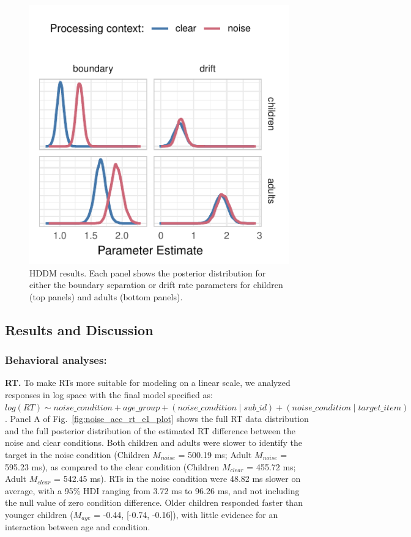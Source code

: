 \documentclass[10pt, letterpaper]{article}
\newenvironment{CodeChunk}{}{}
\begin{document}
\begin{CodeChunk}
\begin{figure}[t]

{\centering \includegraphics[width=0.75\linewidth]{figs/hddm_plot_noise-1} 

}

\caption[HDDM results]{HDDM results. Each panel shows the posterior distribution for either the boundary separation or drift rate parameters for children (top panels) and adults (bottom panels).}\label{fig:hddm_plot_noise}
\end{figure}
\end{CodeChunk}

\hypertarget{results-and-discussion}{%
\subsection{Results and Discussion}\label{results-and-discussion}}

\hypertarget{behavioral-analyses}{%
\subsubsection{Behavioral analyses:}\label{behavioral-analyses}}

\textbf{RT.} To make RTs more suitable for modeling on a linear scale,
we analyzed responses in log space with the final model specified as:
\texttt{$log(RT) \sim noise\_condition + age\_group + (noise\_condition \mid sub\_id ) + (noise\_condition \mid target\_item)$}.
Panel A of Fig.~\ref{fig:noise_acc_rt_e1_plot} shows the full RT data
distribution and the full posterior distribution of the estimated RT
difference between the noise and clear conditions. Both children and
adults were slower to identify the target in the noise condition
(Children \(M_{noise}\) = 500.19 ms; Adult \(M_{noise}\) = 595.23 ms),
as compared to the clear condition (Children \(M_{clear}\) = 455.72 ms;
Adult \(M_{clear}\) = 542.45 ms). RTs in the noise condition were 48.82
ms slower on average, with a 95\% HDI ranging from 3.72 ms to 96.26 ms,
and not including the null value of zero condition difference. Older
children responded faster than younger children (\(M_{age}\) = -0.44,
{[}-0.74, -0.16{]}), with little evidence for an interaction between age
and condition.
\end{document}
